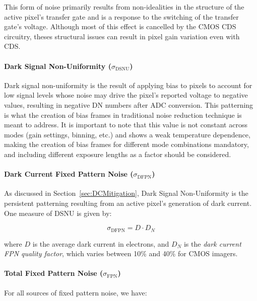 \documentclass[10pt]{article}
\begin{document}
This form of noise primarily results from non-idealities in the structure of the active pixel's transfer gate and is a response to the switching of the transfer gate's voltage. Although most of this effect is cancelled by the CMOS CDS circuitry, theses structural issues can result in pixel gain variation even with CDS.

\paragraph{Dark Signal Non-Uniformity (\boldmath $\sigma_{\text{DSNU}}$)}

Dark signal non-uniformity is the result of applying bias to pixels to account for low signal levels whose noise may drive the pixel's reported voltage to negative values, resulting in negative DN numbers after ADC conversion. This patterning is what the creation of bias frames in traditional noise reduction technique is meant to address. It is important to note that this value is not constant across modes (gain settings, binning, etc.) and shows a weak temperature dependence, making the creation of bias frames for different mode combinations mandatory, and including different exposure lengths as a factor should be considered.

\paragraph{Dark Current Fixed Pattern Noise (\boldmath $\sigma_{\text{DFPN}}$)}
As discussed in Section~\ref{sec:DCMitigation}, Dark Signal Non-Uniformity is the persistent patterning resulting from an active pixel's generation of dark current. One measure of DSNU is given by:

\vspace{-4mm}

$$\sigma_{\text{DFPN}} = D \cdot D_N $$

\vspace{2mm}

\noindent where $D$ is the average dark current in electrons, and $D_N$ is the \emph{dark current FPN quality factor}, which varies between 10\% and 40\% for CMOS imagers.

\paragraph{Total Fixed Pattern Noise (\boldmath $\sigma_{\text{FPN}}$)}

For all sources of fixed pattern noise, we have:
\end{document}
